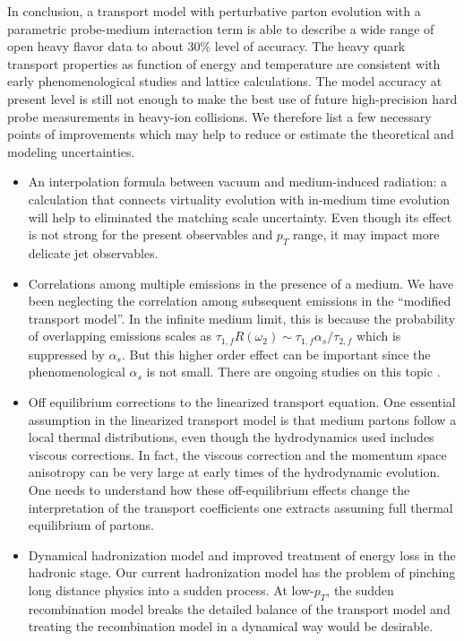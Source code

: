 In conclusion, a transport model with perturbative parton evolution with a parametric probe-medium interaction term is able to describe a wide range of open heavy flavor data to about 30\% level of accuracy.
The heavy quark transport properties as function of energy and temperature are consistent with early phenomenological studies and lattice calculations.
The model accuracy at present level is still not enough to make the best use of future high-precision hard probe measurements in heavy-ion collisions.
We therefore list a few necessary points of improvements which may help to reduce or estimate the theoretical and modeling uncertainties.
\begin{itemize}
\item An interpolation formula between vacuum and medium-induced radiation: a calculation that connects virtuality evolution with in-medium time evolution will help to eliminated the matching scale uncertainty. Even though its effect is not strong for the present observables and $p_T$ range, it may impact more delicate jet observables.
\item Correlations among multiple emissions in the presence of a medium. We have been neglecting the correlation among subsequent emissions in the ``modified transport model''. In the infinite medium limit, this is because the probability of overlapping emissions scales as $\tau_{1,f} R(\omega_2) \sim \tau_{1,f} \alpha_s/\tau_{2,f}$ which is suppressed by $\alpha_s$. But this higher order effect can be important since the phenomenological $\alpha_s$ is not small. There are ongoing studies on this topic \cite{Arnold:2015qya,Arnold:2016kek,Arnold:2016mth,Arnold:2016jnq}.
\item Off equilibrium corrections to the linearized transport equation. One essential assumption in the linearized transport model is that medium partons follow a local thermal distributions, even though the hydrodynamics used includes viscous corrections. 
In fact, the viscous correction and the momentum space anisotropy can be very large at early times of the hydrodynamic evolution. 
One needs to understand how these off-equilibrium effects change the interpretation of the transport coefficients one extracts assuming full thermal equilibrium of partons.
\item Dynamical hadronization model and improved treatment of energy loss in the hadronic stage.
Our current hadronization model has the problem of pinching long distance physics into a sudden process. 
At low-$p_T$, the sudden recombination model breaks the detailed balance of the transport model and treating the recombination model in a dynamical way would be desirable.

\end{itemize}
